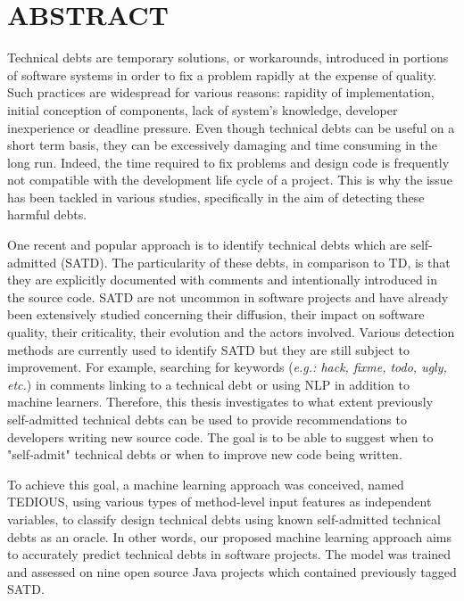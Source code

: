 %

\chapter*{ABSTRACT}\thispagestyle{headings}

\setlength{\parindent}{5ex} Technical debts are temporary solutions, or workarounds, introduced in portions of software systems in order to fix a problem rapidly at the expense of quality. Such practices are widespread for various reasons: rapidity of implementation, initial conception of components, lack of system's knowledge, developer inexperience or deadline pressure. Even though technical debts can be useful on a short term basis, they can be excessively damaging and time consuming in the long run. Indeed, the time required to fix problems and design code is frequently not compatible with the development life cycle of a project. This is why the issue has been tackled in various studies, specifically in the aim of detecting these harmful debts. \par

One recent and popular approach is to identify technical debts which are self-admitted (SATD). The particularity of these debts, in comparison to \ac{TD}, is that they are explicitly documented with comments and intentionally introduced in the source code. \ac{SATD} are not uncommon in software projects and have already been extensively studied concerning their diffusion, their impact on software quality, their criticality, their evolution and the actors involved. Various detection methods are currently used to identify \ac{SATD} but they are still subject to improvement. For example, searching for keywords (\emph{e.g.: hack, fixme, todo, ugly, etc.}) in comments linking to a technical debt or using \ac{NLP} in addition to machine learners. Therefore, this thesis investigates to what extent previously self-admitted technical debts can be used to provide recommendations to developers writing new source code. The goal is to be able to suggest when to "self-admit" technical debts or when to improve new code being written. \par

To achieve this goal, a machine learning approach was conceived, named \ac{TEDIOUS}, using various types of method-level input features as independent variables, to classify design technical debts using known self-admitted technical debts as an oracle. In other words, our proposed machine learning approach aims to accurately predict technical debts in software projects. The model was trained and assessed on nine open source Java projects which contained previously tagged \ac{SATD}. \par

